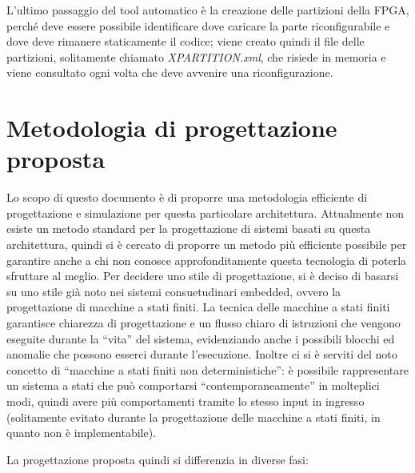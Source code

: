 \documentclass[11pt]{article} %
\begin{document}
L'ultimo passaggio del tool automatico è la creazione delle partizioni della FPGA, perché deve essere possibile identificare dove caricare la parte riconfigurabile e dove deve rimanere staticamente il codice; viene creato quindi il file delle partizioni, solitamente chiamato \textit{XPARTITION.xml}, che risiede in memoria e viene consultato ogni volta che deve avvenire una riconfigurazione.

\section{Metodologia di progettazione proposta}

Lo scopo di questo documento è di proporre una metodologia efficiente di progettazione e simulazione per questa particolare architettura. Attualmente non esiste un metodo standard per la progettazione di sistemi basati su questa architettura, quindi si è cercato di proporre un metodo più efficiente possibile per garantire anche a chi non conosce approfonditamente questa tecnologia di poterla sfruttare al meglio.
Per decidere uno stile di progettazione, si è deciso di basarsi su uno stile già noto nei sistemi consuetudinari embedded, ovvero la progettazione di macchine a stati finiti. La tecnica delle macchine a stati finiti garantisce chiarezza di progettazione e un flusso chiaro di istruzioni che vengono eseguite durante la ``vita'' del sistema, evidenziando anche i possibili blocchi ed anomalie che possono esserci durante l'esecuzione. Inoltre ci si è serviti del noto concetto di ``macchine a stati finiti non deterministiche'': è possibile rappresentare un sistema a stati che può comportarsi ``contemporaneamente'' in molteplici modi, quindi avere più comportamenti tramite lo stesso input in ingresso (solitamente evitato durante la progettazione delle macchine a stati finiti, in quanto non è implementabile).

La progettazione proposta quindi si differenzia in diverse fasi:
\end{document}
